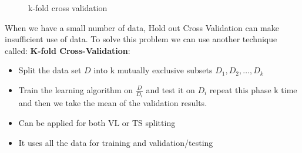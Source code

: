 \documentclass[../main.tex]{subfiles}
\begin{document}
\begin{figure}[H]
      \centering
      \begin{adjustbox}{minipage=\linewidth,scale=0.7}
      \hfill
      \caption{k-fold cross validation}
      \end{adjustbox}
\end{figure}
When we have a small number of data, Hold out Cross Validation can make insufficient use of data. To solve this problem we can use another technique called: \textbf{K-fold Cross-Validation}:

\begin{itemize}
    \item Split the data set $D$ into k mutually exclusive subsets $D_1,D_2,\dots,D_k$
    \item Train the learning algorithm on $\frac{D}{D_{i}}$ and test it on $D_i$ repeat this phase k time and then we take the mean of the validation results.
    \item Can be applied for both VL or TS splitting
    \item It uses all the data for training and validation/testing
\end{itemize}
\end{document}
